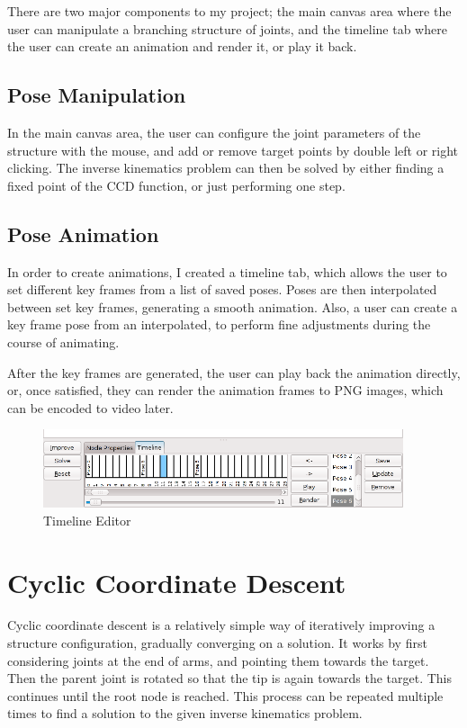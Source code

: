 \documentclass{article}
\begin{document}
    There are two major components to my project; the main canvas area where the
    user can manipulate a branching structure of joints, and the timeline tab
    where the user can create an animation and render it, or play it back.

    \subsection{Pose Manipulation}
    In the main canvas area, the user can configure the joint parameters of the
    structure with the mouse, and add or remove target points by double left or
    right clicking. The inverse kinematics problem can then be solved by either
    finding a fixed point of the CCD function, or just performing one step.

    \subsection{Pose Animation}
    In order to create animations, I created a timeline tab, which allows the
    user to set different key frames from a list of saved poses. Poses are then
    interpolated between set key frames, generating a smooth animation. Also, a
    user can create a key frame pose from an interpolated, to perform fine
    adjustments during the course of animating.

    After the key frames are generated, the user can play back the animation
    directly, or, once satisfied, they can render the animation frames to PNG
    images, which can be encoded to video later.

    \begin{figure}[H]
        \caption{Timeline Editor}
        \centering
        \includegraphics[width=400px]{timeline.png}
    \end{figure}

    \section{Cyclic Coordinate Descent}
    Cyclic coordinate descent is a relatively simple way of iteratively
    improving a structure configuration, gradually converging on a solution. It
    works by first considering joints at the end of arms, and pointing them
    towards the target. Then the parent joint is rotated so that the tip is
    again towards the target. This continues until the root node is reached.
    This process can be repeated multiple times to find a solution to the given
    inverse kinematics problem.
    
\end{document}
